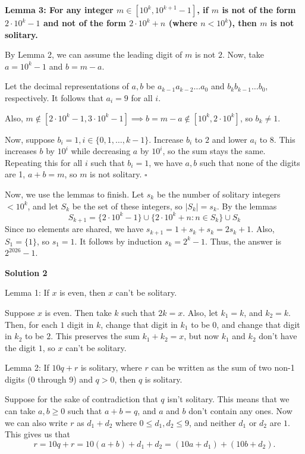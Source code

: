 \begin{enumerate}
 
\textbf{Lemma 3: For any integer $m \in [10^k, 10^{k+1}-1]$, if $m$ is not of the form $2\cdot 10^k - 1$ and not of the form $2\cdot 10^k + n$ (where $n < 10^k$), then $m$ is not solitary.}

 By Lemma 2, we can assume the leading digit of $m$ is not $2$. Now, take $a=10^k-1$ and $b = m-a$. 

 Let the decimal representations of $a, b$ be $a_{k-1}a_{k-2}\dots a_0$ and $b_kb_{k-1}\dots b_0$, respectively. It follows that $a_i=9$ for all $i$. 

 Also, $m\notin [2\cdot 10^k-1, 3\cdot 10^k-1]\implies b = m-a \notin [10^k, 2\cdot 10^k]$, so $b_k\neq 1$. 

 
Now, suppose $b_i = 1, i\in \{0, 1, \dots, k-1\}$. Increase $b_i$ to $2$ and lower $a_i$ to $8$. This increases $b$ by $10^i$ while decreasing $a$ by $10^i$, so the sum stays the same. Repeating this for all $i$ such that $b_i=1$, we have $a, b$ such that none of the digits are 1, $a+b=m$, so $m$ is not solitary. $\square$

 
Now, we use the lemmas to finish. Let $s_k$ be the number of solitary integers $< 10^k$, and let $S_k$ be the set of these integers, so $|S_k|=s_k$. By the lemmas 
 \[S_{k+1} = \{2\cdot 10^k-1\} \cup \{2\cdot 10^k+n : n\in S_k \}\cup S_k\] Since no elements are shared, we have $s_{k+1} = 1 + s_k+s_k=2s_k+1$. Also, $S_1 = \{1\}$, so $s_1 = 1$. It follows by induction $s_k = 2^k-1$. Thus, the answer is $\boxed{2^{2026}-1}$.

 



\textbf{Solution 2}

Lemma 1: If $x$ is even, then $x$ can't be solitary.

 Suppose $x$ is even. Then take $k$ such that $2k = x$. Also, let $k_1 = k$, and $k_2 = k$. Then, for each $1$ digit in $k$, change that digit in $k_1$ to be $0$, and change that digit in $k_2$ to be $2$. This preserves the sum $k_1 + k_2 = x$, but now $k_1$ and $k_2$ don't have the digit $1$, so $x$ can't be solitary.

 Lemma 2: If $10q + r$ is solitary, where $r$ can be written as the sum of two non-1 digits (0 through 9) and $q > 0$, then $q$ is solitary.

 Suppose for the sake of contradiction that $q$ isn't solitary. This means that we can take $a, b \ge 0$ such that $a + b = q$, and $a$ and $b$ don't contain any ones. Now we can also write $r$ as $d_1 + d_2$ where $0 \le d_1, d_2 \le 9$, and neither $d_1$ or $d_2$ are $1$. This gives us that 
 \[r = 10q + r = 10(a + b) + d_1 + d_2 = (10a + d_1) + (10b + d_2).\]


\end{enumerate}
